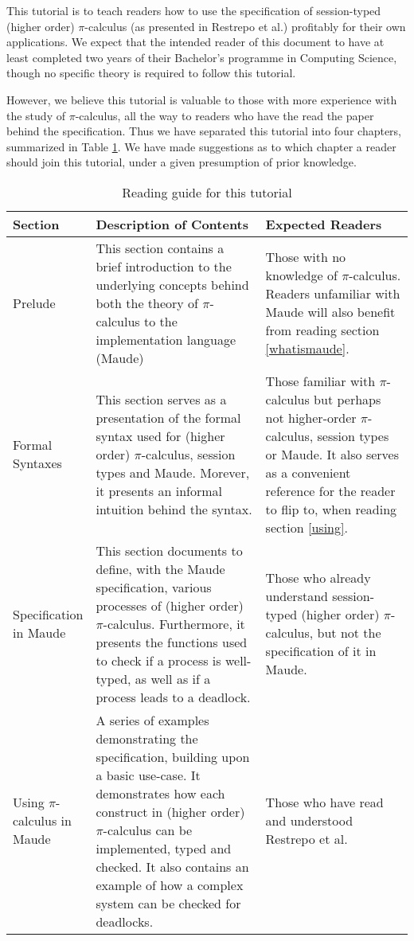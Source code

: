 This tutorial is to teach readers how to use the specification of session-typed (higher order) $\pi$-calculus (as presented in Restrepo et al.\cite{main}) profitably for their own applications. We expect that the intended reader of this document to have at least completed two years of their Bachelor's programme in Computing Science, though no specific theory is required to follow this tutorial.

However, we believe this tutorial is valuable to those with more experience with the study of $\pi$-calculus, all the way to readers who have the read the paper behind the specification. Thus we have separated this tutorial into four chapters, summarized in Table \ref{suggestedreading}. We have made suggestions as to which chapter a reader should join this tutorial, under a given presumption of prior knowledge.

\begin{table}[H]
\centering
\bgroup
\def\arraystretch{1.5}
\begin{tabular}{|>{\raggedright}m{0.16\linewidth} | m{0.45\linewidth} | m{0.4\linewidth}|}
\hline
\textbf{Section} & \textbf{Description of Contents} & \textbf{Expected Readers} \\ \hline

Prelude & This section contains a brief introduction to the underlying concepts behind both the theory of $\pi$-calculus to the implementation language (Maude) & Those with no knowledge of $\pi$-calculus. Readers unfamiliar with Maude will also benefit from reading section \ref{whatismaude}.\\ \hline
Formal Syntaxes & This section serves as a presentation of the formal syntax used for (higher order) $\pi$-calculus, session types and Maude. Morever, it presents an informal intuition behind the syntax. & Those familiar with $\pi$-calculus but perhaps not higher-order $\pi$-calculus, session types or Maude. It also serves as a convenient reference for the reader to flip to, when reading section \ref{using}.\\ \hline
Specification in Maude & This section documents to define, with the Maude specification, various processes of (higher order) $\pi$-calculus. Furthermore, it presents the functions used to check if a process is well-typed, as well as if a process leads to a deadlock. & Those who already understand session-typed (higher order) $\pi$-calculus, but not the specification of it in Maude. \\ \hline
Using $\pi$-calculus in Maude & A series of examples demonstrating the specification, building upon a basic use-case. It demonstrates how each construct in (higher order) $\pi$-calculus can be implemented, typed and checked. It also contains an example of how a complex system can be checked for deadlocks. & Those who have read and understood Restrepo et al. \cite{main} \\ \hline

\hline
\end{tabular}
\egroup
\caption{\label{suggestedreading} Reading guide for this tutorial}
\end{table}
